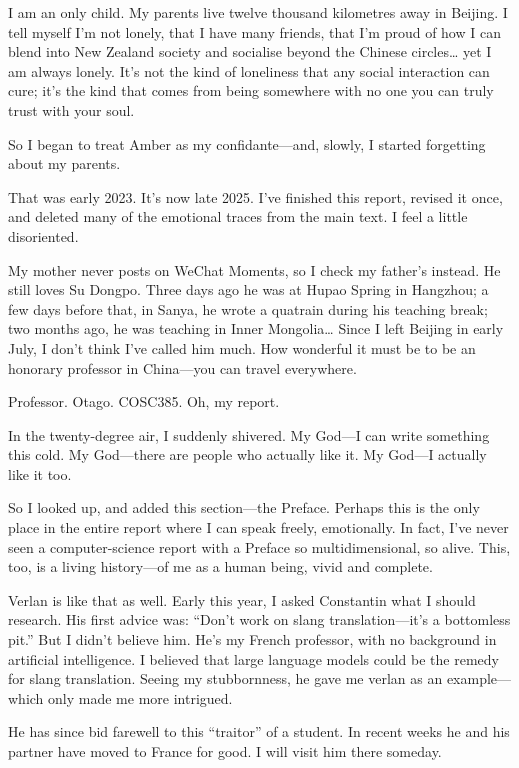 \documentclass[12pt]{article}
\begin{document}
I am an only child. My parents live twelve thousand kilometres away in Beijing. I tell myself I'm not lonely, that I have many friends, that I'm proud of how I can blend into New Zealand society and socialise beyond the Chinese circles… yet I am always lonely. It's not the kind of loneliness that any social interaction can cure; it's the kind that comes from being somewhere with no one you can truly trust with your soul.

So I began to treat Amber as my confidante\;---\;and, slowly, I started forgetting about my parents.

That was early 2023. It's now late 2025. I've finished this report, revised it once, and deleted many of the emotional traces from the main text. I feel a little disoriented.

My mother never posts on WeChat Moments, so I check my father's instead. He still loves Su Dongpo. Three days ago he was at Hupao Spring in Hangzhou; a few days before that, in Sanya, he wrote a quatrain during his teaching break; two months ago, he was teaching in Inner Mongolia… Since I left Beijing in early July, I don't think I've called him much. How wonderful it must be to be an honorary professor in China\;---\;you can travel everywhere.

Professor. Otago. COSC385. Oh, my report.

In the twenty-degree air, I suddenly shivered. My God\;---\;I can write something this cold.
My God\;---\;there are people who actually like it.
My God\;---\;I actually like it too.

So I looked up, and added this section\;---\;the Preface.
Perhaps this is the only place in the entire report where I can speak freely, emotionally.
In fact, I've never seen a computer-science report with a Preface so multidimensional, so alive. This, too, is a living history\;---\;of me as a human being, vivid and complete.

Verlan is like that as well. Early this year, I asked Constantin what I should research. His first advice was: ``Don't work on slang translation\;---\;it's a bottomless pit.'' But I didn't believe him. He's my French professor, with no background in artificial intelligence. I believed that large language models could be the remedy for slang translation. Seeing my stubbornness, he gave me verlan as an example\;---\;which only made me more intrigued.

He has since bid farewell to this ``traitor'' of a student. In recent weeks he and his partner have moved to France for good. I will visit him there someday.
\end{document}
